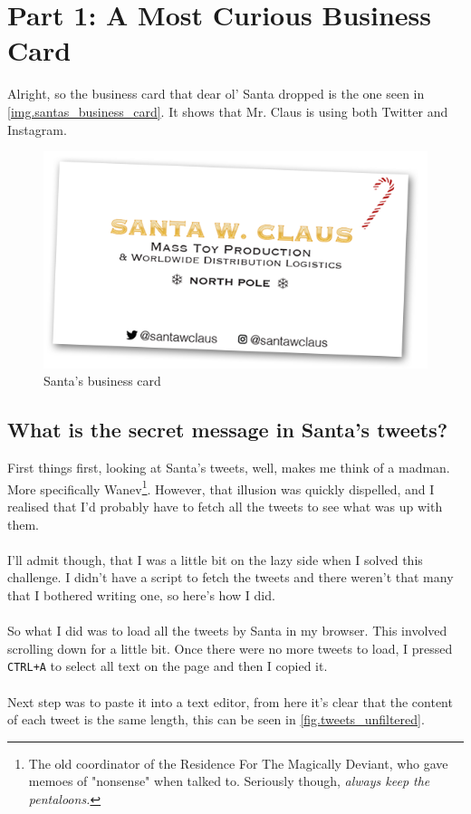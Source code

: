 \documentclass[writeup.tex]{subfiles}
\begin{document}
\section{Part 1: A Most Curious Business Card}
	Alright, so the business card that dear ol' Santa dropped is the one seen in \autoref{img.santas_business_card}. It shows that Mr. Claus is using both Twitter and Instagram. 

	\begin{figure}[H]
		\centering
		\includegraphics[scale=.50]{images/santawclaus_shadow}
		\caption{Santa's business card}
		\label{img.santas_business_card}
	\end{figure}
		
		
	\subsection{What is the secret message in Santa's tweets?}
		First things first, looking at Santa's tweets, well, makes me think of a madman. More specifically Wanev\footnote{The old coordinator of the Residence For The Magically Deviant, who gave memoes of "nonsense" when talked to. Seriously though, \textit{always keep the pentaloons.}}. However, that illusion was quickly dispelled, and I realised that I'd probably have to fetch all the tweets to see what was up with them.\\
		\\
		I'll admit though, that I was a little bit on the lazy side when I solved this challenge. I didn't have a script to fetch the tweets and there weren't that many that I bothered writing one, so here's how I did.\\
		\\		
		 So what I did was to load all the tweets by Santa in my browser. This involved scrolling down for a little bit. Once there were no more tweets to load, I pressed \lstinline!CTRL+A! to select all text on the page and then I copied it. \\
		\\
		Next step was to paste it into a text editor, from here it's clear that the content of each tweet is the same length, this can be seen in \autoref{fig.tweets_unfiltered}. 
	
\end{document}
